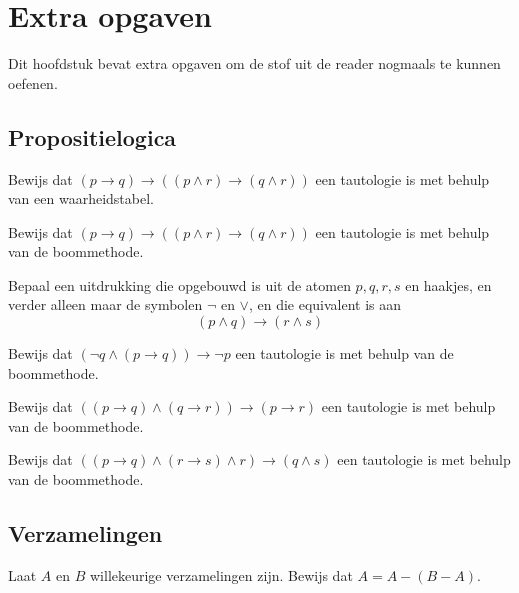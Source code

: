 \chapter{Extra opgaven}\label{ch:extra:opgaven}
Dit hoofdstuk bevat extra opgaven om de stof uit de reader nogmaals te kunnen oefenen.

\renewcommand{\theexerciseT}{Ex.\arabic{section}.\arabic{exerciseT}}

\section{Propositielogica}
\setcounter{exerciseT}{0}
\begin{exercise}
Bewijs dat $(p\rightarrow q)\rightarrow ((p\land r)\rightarrow (q\land r))$ een tautologie is met behulp van een waarheidstabel.
\end{exercise}

\begin{exercise}
Bewijs dat $(p\rightarrow q)\rightarrow((p\land r)\rightarrow (q\land r))$ een tautologie is met behulp van de boommethode.
\end{exercise}

\begin{exercise}
Bepaal een uitdrukking die opgebouwd is uit de atomen $p,q,r,s$ en haakjes, en verder alleen maar de symbolen $\neg$ en $\lor$, en die equivalent is aan
    $$(p\land q)\rightarrow(r\land s)$$
\end{exercise}

\begin{exercise}
Bewijs dat $(\neg q\land(p\rightarrow q))\rightarrow\neg p$ een tautologie is met behulp van de boommethode.
\end{exercise}

\begin{exercise}
Bewijs dat $((p\rightarrow q)\land(q\rightarrow r))\rightarrow (p\rightarrow r)$ een tautologie is met behulp van de boommethode.
\end{exercise}

\begin{exercise}
Bewijs dat $((p\rightarrow q)\wedge(r\rightarrow s) \wedge r)\rightarrow (q\wedge s)$ een tautologie is met behulp van de boommethode.
\end{exercise}

\section{Verzamelingen}
\setcounter{exerciseT}{0}
\begin{exercise}
Laat $A$ en $B$ willekeurige verzamelingen zijn. Bewijs dat $A=A-(B-A)$.
\end{exercise}

